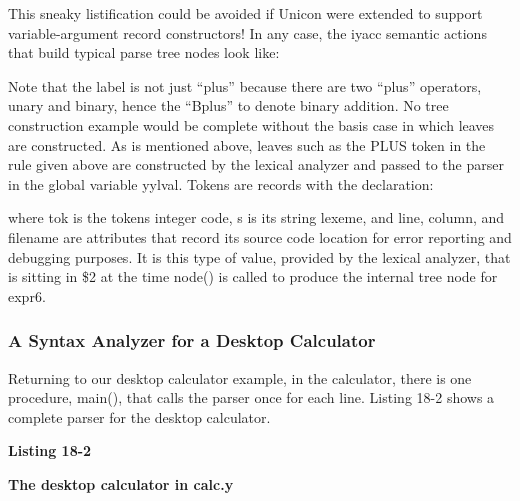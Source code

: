 
This sneaky listification could be avoided if Unicon were extended to
support variable-argument record constructors! In any case, the iyacc
semantic actions that build typical parse tree nodes look like:


Note that the label is not just
{\textquotedblleft}plus{\textquotedblright} because there are two
{\textquotedblleft}plus{\textquotedblright} operators, unary and
binary, hence the {\textquotedblleft}Bplus{\textquotedblright} to
denote binary addition. No tree construction example would be complete
without the basis case in which leaves are constructed. As is mentioned
above, leaves such as the \textsf{PLUS} token in the rule given above
are constructed by the lexical analyzer and passed to the parser in the
global variable \textsf{yylval}. Tokens are records with the
declaration:


\noindent
where \textsf{tok} is the token{\textquotesingle}s integer code,
\textsf{s} is its string lexeme, and \textsf{line}, \textsf{column},
and \textsf{filename} are attributes that record its source code
location for error reporting and debugging purposes. It is this type of
value, provided by the lexical analyzer, that is sitting in
\textsf{\$2} at the time \textsf{node()} is called to produce the
internal tree node for \textsf{expr6}.

\subsubsection{A Syntax Analyzer for a Desktop Calculator}
Returning to our desktop calculator example, in the calculator, there is
one procedure, \textsf{main()}, that calls the parser once for each
line. Listing 18-2 shows a complete parser for the desktop calculator.

\bigskip

{\sffamily\bfseries
Listing 18-2}

{\sffamily\bfseries
The desktop calculator in calc.y}

